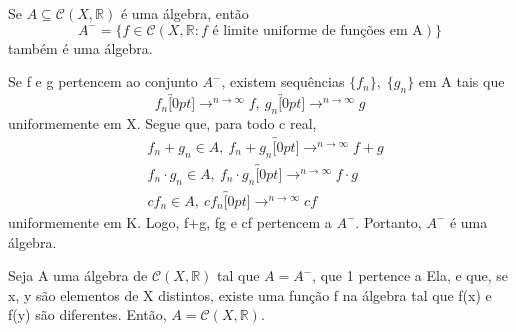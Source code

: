 \documentclass[../analysis_notes.tex]{subfiles}
\begin{document}
\begin{theorem*}
	Se \(A\subseteq \mathcal{C}(X, \mathbb{R})\) é uma álgebra, então
	\[
		A^{-}=\{f\in \mathcal{C}(X, \mathbb{R}: f\text{ é limite uniforme de funções em A})\}
	\]
	também é uma álgebra.
\end{theorem*}
\begin{proof*}
	Se f e g pertencem ao conjunto \(A^{-}\), existem sequências \(\{f_{n}\}, \;\{g_{n}\}\) em A tais que
	\[
		f_{n}\overbracket[0pt]{\longrightarrow}^{n\to \infty}f,\:g_{n}\overbracket[0pt]{\longrightarrow}^{n\to \infty}g
	\]
	uniformemente em X. Segue que, para todo c real,
	\begin{align*}
		 & f_{n}+g_{n}\in A, \: f_{n}+g_{n}\overbracket[0pt]{\longrightarrow}^{n\to \infty}f+g                 \\
		 & f_{n}\cdot g_{n}\in A, \: f_{n}\cdot g_{n}\overbracket[0pt]{\longrightarrow}^{n\to \infty}f \cdot g \\
		 & cf_{n}\in A, \: cf_{n}\overbracket[0pt]{\longrightarrow}^{n\to \infty}cf
	\end{align*}
	uniformemente em K. Logo, f+g, fg e cf pertencem a \(A^{-}\). Portanto, \(A^{-}\) é uma álgebra. \qedsymbol
\end{proof*}
\hypertarget{stone-weierstrass}{
	\begin{theorem*}
		Seja A uma álgebra de \(\mathcal{C}(X, \mathbb{R})\) tal que \(A = A^{-}\), que 1 pertence a Ela, e que, se x, y são elementos de X distintos, existe uma função f na álgebra tal que f(x) e f(y) são diferentes. Então, \(A = \mathcal{C}(X, \mathbb{R})\).
	\end{theorem*}
}
\end{document}
